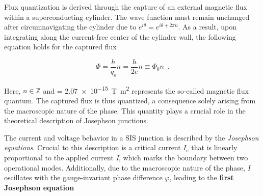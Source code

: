 Flux quantization is derived through the capture of an external magnetic flux within a superconducting cylinder. The wave function must remain unchanged after circumnavigating the cylinder due to $e^{i\theta} = e^{i\theta + 2\pi n}$. As a result, upon integrating along the current-free center of the cylinder wall, the following equation holds for the captured flux

\begin{equation}
\Phi = \frac{h}{q_\mathrm{s}}n = \frac{h}{2e}n \equiv \Phi_0n \ \ .
\end{equation}


Here, $n\in\mathbb{Z}$ and \unit{\fq} = \qty{2.07e-15}{\tesla\metre\squared} \cite{CODATA2018} represents the so-called magnetic flux quantum. The captured flux is thus quantized, a consequence solely arising from the macroscopic nature of the phase. This quantity plays a crucial role in the theoretical description of Josephson junctions.


The current and voltage behavior in a SIS junction is described by the \textit{Josephson equations}. Crucial to this description is a critical current \textit{$I_\mathrm{c}$} that is linearly proportional to the applied current \textit{I}, which marks the boundary between two operational modes. Additionally, due to the macroscopic nature of the phase, \textit{I} oscillates with the gauge-invariant phase difference $\varphi$, leading to the \textbf{first Josephson equation} \cite{Josephson1965}


